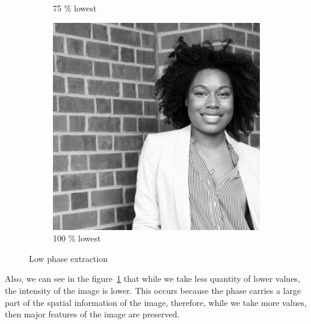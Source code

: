 \begin{figure}[h!]
\begin{subfigure}{0.2\textwidth}
  \caption{75 \% lowest}
\end{subfigure}%
\begin{subfigure}{0.2\textwidth}
  \centering
  \includegraphics[width=0.95\linewidth]{output/phase_low_100.jpg}
  \caption{100 \% lowest}
\end{subfigure}%
 \caption{Low phase extraction}
\label{fig:low-phase}
\end{figure}

Also, we can see in the figure~\ref{fig:low-phase} that while we take less quantity of lower values, the intensity of the image is lower. This occurs because the phase carries a large part of the spatial information of the image, therefore, while we take more values, then major features of the image are preserved.

